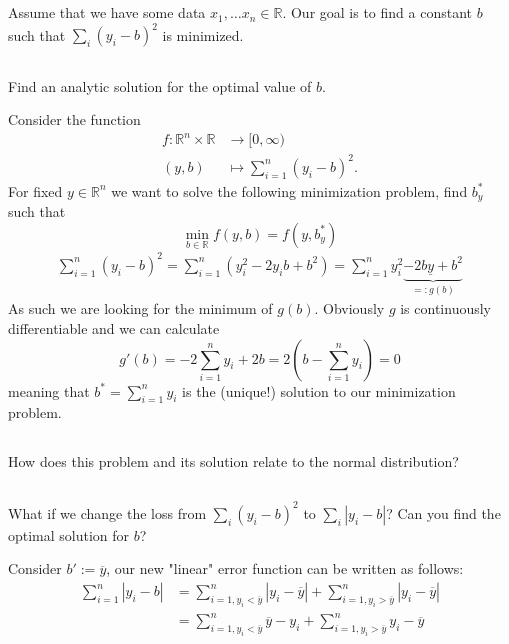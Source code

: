 \documentclass{article}
\begin{document}
\section{}
Assume that we have some data $x_1, \dots x_n \in \mathbb{R}$. Our goal is to find a constant $b$ such that $\sum_i (y_i - b)^2$ is minimized.

\subsection{}
Find an analytic solution for the optimal value of $b$.

Consider the function
\begin{align*}
f : \mathbb{R}^n \times \mathbb{R} &\rightarrow [0, \infty) \\
(y, b) &\mapsto \sum_{i = 1}^n (y_i - b)^2.
\end{align*}
For fixed $y \in \mathbb{R}^n$ we want to solve the following minimization problem, find $b^*_y$ such that
$$
\min_{b \in \mathbb{R}} f(y, b) = f(y, b^*_y)
$$
\begin{align*}
\sum_{i = 1}^n (y_i - b)^2 = \sum_{i = 1}^n (y_i^2 - 2y_i b + b^2) = \sum_{i = 1}^n y_i^2 \underbrace{- 2 b \underline{y} + b^2}_{=: g(b)}
\end{align*}
As such we are looking for the minimum of $g(b)$. Obviously $g$ is continuously differentiable and we can calculate
$$
g'(b) = -2 \sum_{i = 1}^n y_i + 2b = 2 (b - \sum_{i = 1}^n y_i) = 0
$$
meaning that $b^* = \sum_{i = 1}^n y_i$ is the (unique!) solution to our minimization problem.

\subsection{}
How does this problem and its solution relate to the normal distribution?

\subsection{}
What if we change the loss from $\sum_i (y_i - b)^2$ to $\sum_i |y_i - b|$? Can you find the optimal solution for $b$?

Consider $b' := \overline{y}$, our new "linear" error function can be written as follows:
\begin{align*}
\sum_{i = 1}^n |y_i - b| &= \sum_{i = 1, y_i < \overline{y}}^n |y_i - \overline{y}| + \sum_{i = 1, y_i > \overline{y}}^n |y_i - \overline{y}| \\
&= \sum_{i = 1, y_i < \overline{y}}^n \overline{y} - y_i + \sum_{i = 1, y_i > \overline{y}}^n y_i - \overline{y}
\end{align*}
\end{document}
